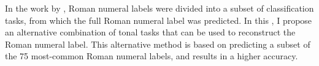 

In the work by \textcite{chen2018functional}, Roman numeral
labels were divided into a subset of classification tasks,
from which the full Roman numeral label was predicted. In
this \thesisdiss{}, I propose an alternative combination of
tonal tasks that can be used to reconstruct the Roman
numeral label. This alternative method is based on
predicting a subset of the 75 most-common Roman numeral
labels, and results in a higher accuracy.
